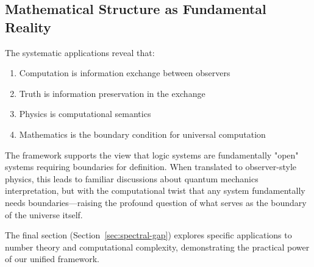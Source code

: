 \subsection{Mathematical Structure as Fundamental Reality}

The systematic applications reveal that:
\begin{enumerate}
\item Computation is information exchange between observers
\item Truth is information preservation in the exchange
\item Physics is computational semantics
\item Mathematics is the boundary condition for universal computation
\end{enumerate}

The framework supports the view that logic systems are fundamentally "open" systems requiring boundaries for definition. When translated to observer-style physics, this leads to familiar discussions about quantum mechanics interpretation, but with the computational twist that any system fundamentally needs boundaries—raising the profound question of what serves as the boundary of the universe itself.

The final section (Section~\ref{sec:spectral-gap}) explores specific applications to number theory and computational complexity, demonstrating the practical power of our unified framework.

